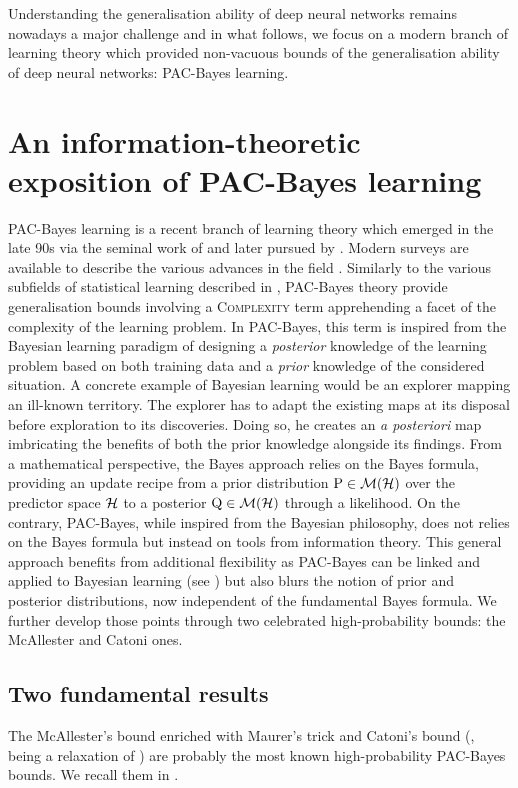 Understanding the generalisation ability of deep neural networks remains nowadays a major challenge and in what follows, we focus on a modern branch of learning theory which provided non-vacuous bounds of the generalisation ability of deep neural networks: PAC-Bayes learning.

\section{An information-theoretic exposition of PAC-Bayes learning}

PAC-Bayes learning is a recent branch of learning theory which emerged in the late 90s via the seminal work of \citep{shawe1997pac,mcallester1998some,mcallester1999pac,mcallester2003pac} and later pursued by \citep{catoni2003pac,catoni2007pac}. Modern surveys are available to describe the various advances in the field \citep{guedj2019primer,hellstrom2023generalization,alquier2024user}.  Similarly to the various subfields of statistical learning described in , PAC-Bayes theory provide generalisation bounds involving a \textsc{Complexity} term apprehending a facet of the complexity of the learning problem. In PAC-Bayes, this term is inspired from the Bayesian learning paradigm of designing a \emph{posterior} knowledge of the learning problem based on both training data and a \emph{prior} knowledge of the considered situation. A concrete example of Bayesian learning would be an explorer mapping an ill-known territory. The explorer has to adapt the existing maps at its disposal before exploration to its discoveries. Doing so, he creates an \emph{a posteriori} map imbricating the benefits of both the prior knowledge alongside its findings. From a mathematical perspective, the Bayes approach relies on the Bayes formula, providing an update recipe from a prior distribution $\mathrm{P}\in\mathcal{M}(\mathcal{H})$ over the predictor space $\mathcal{H}$ to a posterior $\mathrm{Q}\in\mathcal{M}(\mathcal{H})$ through a likelihood. On the contrary, PAC-Bayes, while inspired from the Bayesian philosophy, does not relies on the Bayes formula but instead on tools from information theory. This general approach benefits from additional flexibility as PAC-Bayes can be linked and applied to Bayesian learning (see \citealp{guedj2019primer}) but also blurs the notion of prior and posterior distributions, now independent of the fundamental Bayes formula. We further develop those points through two celebrated  high-probability bounds: the McAllester and Catoni ones. 

\subsection*{Two fundamental results}
    The McAllester's bound \citep{mcallester2003pac} enriched with Maurer's trick \citep{maurer2004note} and Catoni's bound (\citealp[Theorem 4.1]{alquier2016properties}, being a relaxation of \citealp[Theorem 1.2.6]{catoni2007pac}) are probably the most known high-probability PAC-Bayes bounds. We recall them in .

